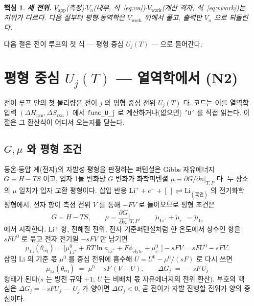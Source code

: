 \documentclass[11pt,a4paper]{article}
\newtheorem*{keybox}{핵심}
\newcommand{\eq}{\mathrm{eq}}
\newcommand{\app}{\mathrm{app}}
\newcommand{\rxn}{\mathrm{rxn}}
\newcommand{\work}{\mathrm{work}}
\newcommand{\code}[1]{\texttt{#1}}
\begin{document}
\begin{keybox}
\textbf{세 전위.} $V_\app$(측정)$\cdot$$V_n$(내부, 식~\eqref{eq:vn})$\cdot$$V_\work$(계산 격자, 식~\eqref{eq:vwork})는
지위가 다르다. 다음 절부터 평형$\cdot$동역학은 $V_\work$ 위에서 풀고, 출력만 $V_n$ 으로 되돌린다.
\end{keybox}

다음 절은 전이 루프의 첫 식 — 평형 중심 $U_j(T)$ — 으로 들어간다.

\section{평형 중심 $U_j(T)$ — 열역학에서 (N2)}\label{sec:center}
전이 루프 안의 첫 물리량은 전이 $j$ 의 평형 중심 전위 $U_j(T)$ 다. 코드는 이를 열역학 입력 $(\Delta H_\rxn,\Delta S_\rxn)$
에서 \code{func\_U\_j} 로 계산하거나(없으면) \code{'U'} 를 직접 읽는다. 이 절은 그 환산식이 어디서 오는지를 닫는다.

\subsection{$G,\mu$ 와 평형 조건}
등온$\cdot$등압 계(전지)의 자발성$\cdot$평형을 판정하는 퍼텐셜은 Gibbs 자유에너지 $G\equiv H-TS$ 이고, 입자 1몰 변화당
$G$ 변화가 화학퍼텐셜 $\mu\equiv\partial G/\partial n|_{T,P}$ 다. 두 장소의 $\mu$ 일치가 입자 교환 평형이다. 삽입 반응
$\mathrm{Li}^++e^-+[\,]\rightleftharpoons\mathrm{Li}_{(\text{흑연})}$ 의 전기화학 평형에서, 전자 항이 측정 전위 $V$ 를
통해 $-FV$ 로 들어오므로 평형 조건은
\begin{equation}
G=H-TS,\qquad
\mu=\frac{\partial G}{\partial n}\Big|_{T,P},\qquad
\tilde\mu_{\mathrm{Li}^+}+\tilde\mu_{e^-}=\tilde\mu_{\mathrm{Li}}
\label{eq:UjderiveA}
\end{equation}
에서 시작한다. Li$^+$ 항, 전해질 전위, 전자 기준퍼텐셜처럼 한 온도에서 상수인 항을 $sFU^0$ 로 묶고 전자 전기일
$-sFV$ 만 남기면
\begin{equation}
\mu_{\mathrm{Li}}(\theta_\eq)
=\big[\mu^0_{\mathrm{Li}^+}+RT\ln a_{\mathrm{Li}^+}+F\phi_{\mathrm{elyte}}+\mu^0_{e^-}\big]-sFV
=sFU^0-sFV.
\label{eq:UjderiveB}
\end{equation}
삽입 Li 의 기준 몫 $\mu^0$ 를 중심 전위에 흡수해 $U=U^0-\mu^0/(sF)$ 로 다시 쓰면
\begin{equation}
\mu_\mathrm{Li}(\theta_\eq)\;=\;\mu^0-sF\,(V-U),
\qquad \Delta G_j\;=\;-sF\,U_j
\label{eq:eqcond}
\end{equation}
형태가 된다($s$ 는 방전 규약 $+1$; $U$ 는 비배치 몫 자유에너지의 전위 환산). 부호의 핵심은 $\Delta G_j=-sFU_j$ —
$U_j$ 가 양이면 $\Delta G_j<0$, 곧 전이가 자발 진행할 전위가 양의 중심이다.
\end{document}
